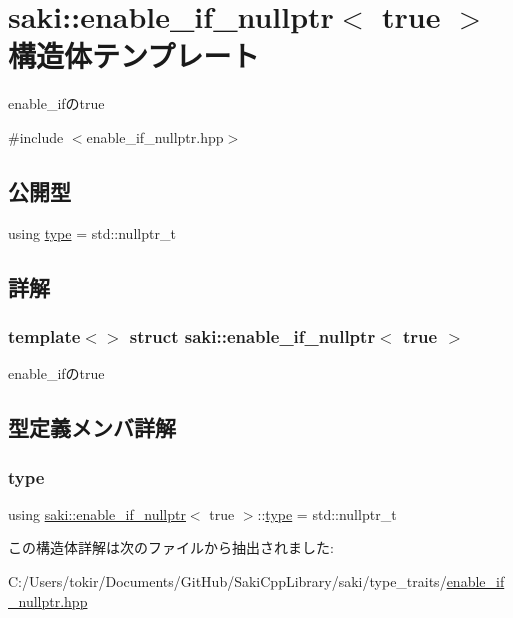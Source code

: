 \hypertarget{structsaki_1_1enable__if__nullptr_3_01true_01_4}{}\section{saki\+:\+:enable\+\_\+if\+\_\+nullptr$<$ true $>$ 構造体テンプレート}
\label{structsaki_1_1enable__if__nullptr_3_01true_01_4}


enable\+\_\+ifのtrue  




{\ttfamily \#include $<$enable\+\_\+if\+\_\+nullptr.\+hpp$>$}

\subsection*{公開型}
\begin{DoxyCompactItemize}
\item 
using \mbox{\hyperlink{structsaki_1_1enable__if__nullptr_3_01true_01_4_a8f1b04372e036f2c7a60c7df41a02e50}{type}} = std\+::nullptr\+\_\+t
\end{DoxyCompactItemize}


\subsection{詳解}
\subsubsection*{template$<$$>$\newline
struct saki\+::enable\+\_\+if\+\_\+nullptr$<$ true $>$}

enable\+\_\+ifのtrue 

\subsection{型定義メンバ詳解}
\mbox{\label{structsaki_1_1enable__if__nullptr_3_01true_01_4_a8f1b04372e036f2c7a60c7df41a02e50}} 
\subsubsection{\texorpdfstring{type}{type}}
{\footnotesize\ttfamily using \mbox{\hyperlink{structsaki_1_1enable__if__nullptr}{saki\+::enable\+\_\+if\+\_\+nullptr}}$<$ true $>$\+::\mbox{\hyperlink{structsaki_1_1enable__if__nullptr_3_01true_01_4_a8f1b04372e036f2c7a60c7df41a02e50}{type}} =  std\+::nullptr\+\_\+t}



この構造体詳解は次のファイルから抽出されました\+:\begin{DoxyCompactItemize}
\item 
C\+:/\+Users/tokir/\+Documents/\+Git\+Hub/\+Saki\+Cpp\+Library/saki/type\+\_\+traits/\mbox{\hyperlink{enable__if__nullptr_8hpp}{enable\+\_\+if\+\_\+nullptr.\+hpp}}\end{DoxyCompactItemize}

